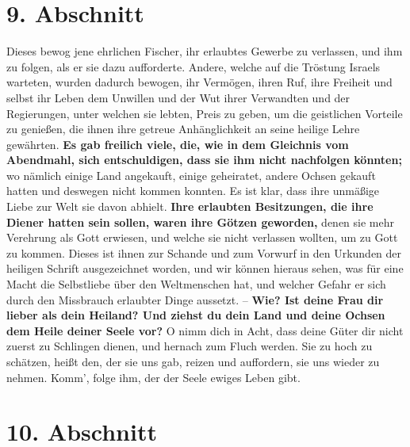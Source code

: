 \section{9. Abschnitt} \label{kap4_ab9}

\label{ref:04_09_besitz}
Dieses bewog jene ehrlichen Fischer, ihr erlaubtes Gewerbe zu verlassen, und ihm
zu folgen, als er sie dazu aufforderte. Andere, welche auf die Tröstung Israels
warteten, wurden dadurch bewogen, ihr Vermögen, ihren Ruf, ihre Freiheit und
selbst ihr Leben dem Unwillen und der Wut ihrer Verwandten und der
Regierungen, unter welchen sie lebten, Preis zu geben, um die geistlichen
Vorteile zu genießen, die ihnen ihre getreue Anhänglichkeit an seine heilige
Lehre gewährten. \textbf{Es gab freilich viele, die, wie in dem Gleichnis vom
Abendmahl, sich entschuldigen, dass sie ihm nicht nachfolgen könnten;} wo
nämlich
einige Land angekauft, einige geheiratet, andere Ochsen gekauft hatten und
deswegen nicht kommen konnten.
Es ist klar, dass ihre
unmäßige Liebe zur Welt sie davon abhielt. \textbf{Ihre erlaubten Besitzungen,
die ihre
Diener hatten sein sollen, waren ihre Götzen geworden,} denen sie
mehr Verehrung
als Gott erwiesen, und welche sie nicht verlassen wollten, um zu Gott zu kommen.
Dieses ist ihnen zur Schande und zum Vorwurf in den Urkunden der heiligen
Schrift ausgezeichnet worden, und wir können hieraus sehen, was für eine Macht
die Selbstliebe über den Weltmenschen hat, und welcher Gefahr er sich durch den
Missbrauch erlaubter Dinge aussetzt. -- \textbf{Wie? Ist deine Frau dir lieber
als dein
Heiland? Und ziehst du dein Land und deine Ochsen dem Heile deiner Seele vor?}
O
nimm dich in Acht, dass deine Güter dir nicht zuerst zu Schlingen dienen, und
hernach zum Fluch werden. Sie zu hoch zu schätzen, heißt den, der sie uns gab,
reizen und auffordern, sie uns wieder zu nehmen. Komm', folge ihm, der der Seele
ewiges Leben gibt.

\section{10. Abschnitt} \label{kap4_ab10}

